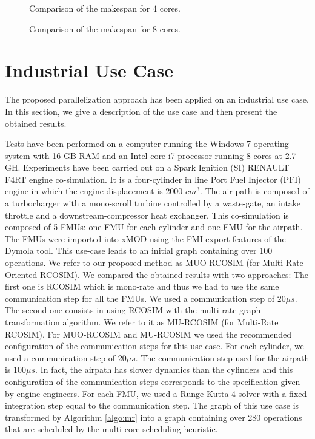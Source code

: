 \begin{figure}[phbt]
\centering

\caption{Comparison of the makespan for $4$ cores.}
\label{fig:sched_mkspan_4}
\end{figure}

\begin{figure}[phbt]
\centering

\caption{Comparison of the makespan for $8$ cores.}
\label{fig:sched_mkspan_8}
\end{figure} 

\section{Industrial Use Case}

The proposed parallelization approach has been applied on an industrial use case. In this section, we give a description of the use case and then present the obtained results. 

Tests have been performed on a computer running the Windows 7 operating system with 16 GB RAM and an Intel core i7 processor running 8 cores at 2.7 GH. Experiments have been carried out on a Spark Ignition (SI) RENAULT F4RT engine co-simulation. It is a four-cylinder in line Port Fuel Injector (PFI) engine in which the engine displacement is 2000 $cm^3$. The air path is composed of a turbocharger with a mono-scroll turbine controlled by a waste-gate, an intake throttle and a downstream-compressor heat exchanger. This co-simulation is composed of 5 FMUs: one FMU for each cylinder and one FMU for the airpath. The FMUs were imported into xMOD using the FMI export features of the Dymola tool. This use-case leads to an initial graph containing over 100 operations. We refer to our proposed method as MUO-RCOSIM (for Multi-Rate Oriented RCOSIM). We compared the obtained results with two approaches: The first one is RCOSIM which is mono-rate and thus we had to use the same communication step for all the FMUs. We used a communication step of $20 {\mu}s$. The second one consists in using RCOSIM with the multi-rate graph transformation algorithm. We refer to it as MU-RCOSIM (for Multi-Rate RCOSIM). For MUO-RCOSIM and MU-RCOSIM we used the recommended configuration of the communication steps for this use case. For each cylinder, we used a communication step of $20 {\mu}s$. The communication step used for the airpath is $100 {\mu}s$. In fact, the airpath has slower dynamics than the cylinders and this configuration of the communication steps corresponds to the specification given by engine engineers. For each FMU, we used a Runge-Kutta 4 solver with a fixed integration step equal to the communication step. The graph of this use case is transformed by Algorithm \ref{algo:mr} into a graph containing over 280 operations that are scheduled by the multi-core scheduling heuristic.      


